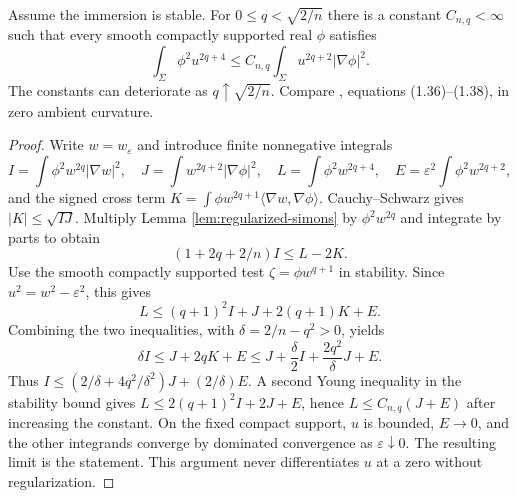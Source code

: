 \begin{proposition}\label{prop:stable-weighted-curvature}
Assume the immersion is stable. For $0\leq q<\sqrt{2/n}$ there is a constant $C_{n,q}<\infty$ such that every smooth compactly supported real $\phi$ satisfies
\[
 \int_\Sigma\phi^2u^{2q+4}
 \leq C_{n,q}\int_\Sigma u^{2q+2}|\nabla\phi|^2.
\]
The constants can deteriorate as $q\uparrow\sqrt{2/n}$. Compare \cite{SSY75}, equations (1.36)--(1.38), in zero ambient curvature.
\end{proposition}
\begin{proof}
Write $w=w_\varepsilon$ and introduce finite nonnegative integrals
\[
 I=\int\phi^2w^{2q}|\nabla w|^2,\quad
 J=\int w^{2q+2}|\nabla\phi|^2,\quad
 L=\int\phi^2w^{2q+4},\quad
 E=\varepsilon^2\int\phi^2w^{2q+2},
\]
and the signed cross term $K=\int\phi w^{2q+1}\langle\nabla w,\nabla\phi\rangle$. Cauchy--Schwarz gives $|K|\leq\sqrt{IJ}$. Multiply Lemma \ref{lem:regularized-simons} by $\phi^2w^{2q}$ and integrate by parts to obtain
\[
 (1+2q+2/n)I\leq L-2K.
\]
Use the smooth compactly supported test $\zeta=\phi w^{q+1}$ in stability. Since $u^2=w^2-\varepsilon^2$, this gives
\[
 L\leq(q+1)^2I+J+2(q+1)K+E.
\]
Combining the two inequalities, with $\delta=2/n-q^2>0$, yields
\[
 \delta I\leq J+2qK+E
 \leq J+\frac\delta2 I+\frac{2q^2}{\delta}J+E.
\]
Thus $I\leq(2/\delta+4q^2/\delta^2)J+(2/\delta)E$. A second Young inequality in the stability bound gives $L\leq2(q+1)^2I+2J+E$, hence $L\leq C_{n,q}(J+E)$ after increasing the constant. On the fixed compact support, $u$ is bounded, $E\to0$, and the other integrands converge by dominated convergence as $\varepsilon\downarrow0$. The resulting limit is the statement. This argument never differentiates $u$ at a zero without regularization.
\end{proof}

